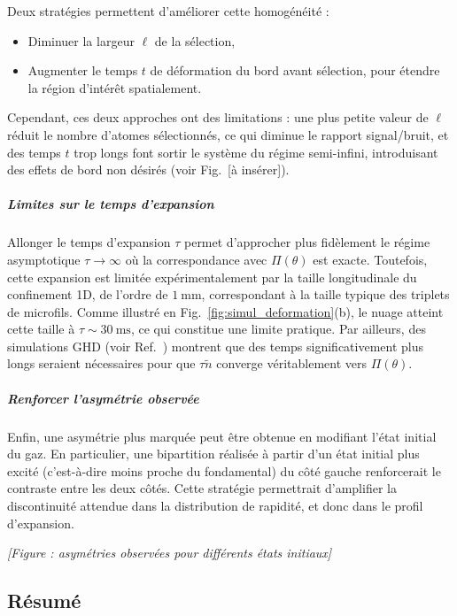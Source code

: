 Deux stratégies permettent d’améliorer cette homogénéité :
\begin{itemize}[label = $\bullet$] 
    \item Diminuer la largeur $\ell$ de la sélection,
    \item Augmenter le temps $t$ de déformation du bord avant sélection, pour étendre la région d’intérêt spatialement.
\end{itemize}
Cependant, ces deux approches ont des limitations : une plus petite valeur de $\ell$ réduit le nombre d’atomes sélectionnés, ce qui diminue le rapport signal/bruit, et des temps $t$ trop longs font sortir le système du régime semi-infini, introduisant des effets de bord non désirés (voir Fig.~[à insérer]).

\subparagraph{Limites sur le temps d’expansion}

Allonger le temps d’expansion $\tau$ permet d’approcher plus fidèlement le régime asymptotique $\tau \to \infty$ où la correspondance avec $\Pi(\theta)$ est exacte. Toutefois, cette expansion est limitée expérimentalement par la taille longitudinale du confinement 1D, de l’ordre de $1~\mathrm{mm}$, correspondant à la taille typique des triplets de microfils. Comme illustré en Fig.~\ref{fig:simul_deformation}(b), le nuage atteint cette taille à $\tau \sim 30~\mathrm{ms}$, ce qui constitue une limite pratique. Par ailleurs, des simulations GHD (voir Ref.~\cite{dubois_probing_2024}) montrent que des temps significativement plus longs seraient nécessaires pour que $\tau \tilde{n}$ converge véritablement vers $\Pi(\theta)$.

\subparagraph{Renforcer l’asymétrie observée}

Enfin, une asymétrie plus marquée peut être obtenue en modifiant l’état initial du gaz. En particulier, une bipartition réalisée à partir d’un état initial plus excité (c’est-à-dire moins proche du fondamental) du côté gauche renforcerait le contraste entre les deux côtés. Cette stratégie permettrait d’amplifier la discontinuité attendue dans la distribution de rapidité, et donc dans le profil d’expansion.

\vspace{1em}
\begin{center}
\textit{[Figure : asymétries observées pour différents états initiaux]}
\end{center}

\subsection*{Résumé}

